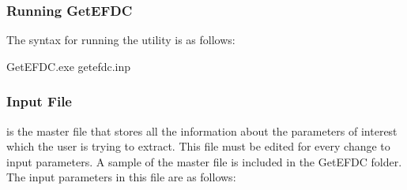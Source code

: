 \documentclass[letterpaper,10pt,english]{sphinxmanual}
\begin{document}
\subsubsection{Running GetEFDC}
\label{\detokenize{outputfiles/getefdc:running-getefdc}}
The syntax for running the utility is as follows:

\begin{sphinxVerbatim}[commandchars=\\\{\}]
GetEFDC.exe getefdc.inp
\end{sphinxVerbatim}


\subsubsection{Input File}
\label{\detokenize{outputfiles/getefdc:input-file}}
 is the master file that stores all the information about the parameters of
interest which the user is trying to extract. This file must be edited for every change to input
parameters. A sample of the master file is included in the GetEFDC folder. The input
parameters in this file are as follows:
\end{document}
